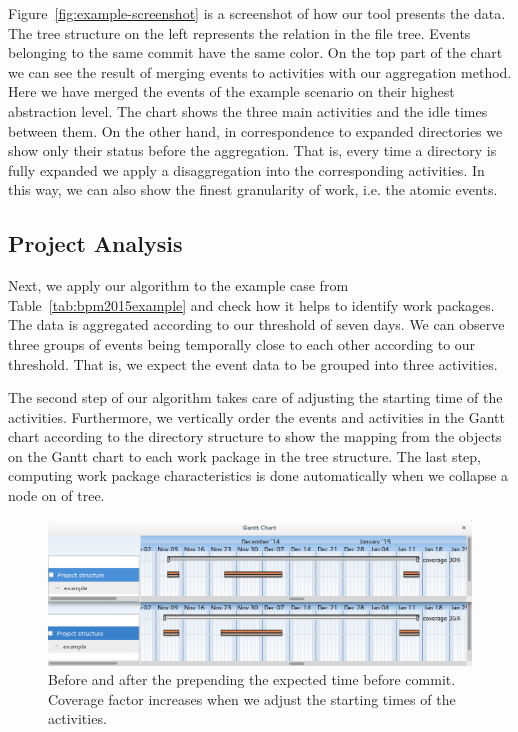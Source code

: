 Figure~\ref{fig:example-screenshot} is a screenshot of how our tool presents the data. The tree structure on the left represents the \parent relation in the file tree. Events belonging to the same commit have the same color. On the top part of the chart we can see the result of merging events to activities with our aggregation method. Here we have merged the events of the example scenario on their highest abstraction level. The chart shows the three main activities and the idle times between them. %
On the other hand, in correspondence to expanded directories we show only their status before the aggregation. That is, every time a directory is fully expanded we apply a disaggregation into the corresponding activities. In this way, we can also show the finest granularity of work, i.e. the atomic events.

\subsection{Project Analysis}
Next, we apply our algorithm to the example case from Table~\ref{tab:bpm2015example} and check how it helps to identify work packages. The data is aggregated according to our threshold of seven days. We can observe three groups of events being temporally close to each other according to our threshold. That is, we expect the event data to be grouped into three activities.

The second step of our algorithm takes care of adjusting the starting time of the activities. Furthermore, we vertically order the events and activities in the Gantt chart according to the directory structure to show the mapping from the objects on the Gantt chart to each work package in the tree structure. The last step, computing work package characteristics is done automatically when we collapse a node on of tree.

\begin{figure}
\centering
\includegraphics[width=\textwidth]{bpm2015/imgs/coverage_before_and_after}
\caption{Before and after the prepending the expected time before commit. Coverage factor increases when we adjust the starting times of the activities.}
\label{fig:example-collapsed}
\end{figure}

